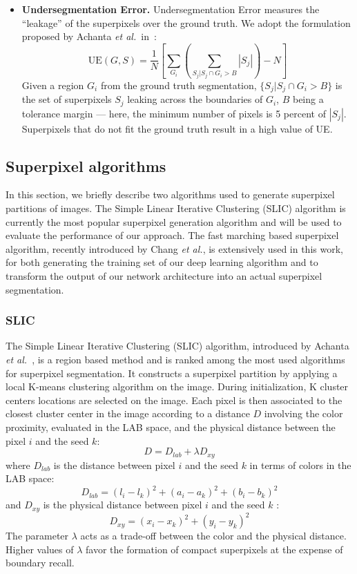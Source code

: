 \documentclass{article}
\begin{document}
\begin{itemize}
            \item \textbf{Undersegmentation Error.} Undersegmentation Error measures the ``leakage'' of the superpixels over the ground truth. We adopt the formulation proposed by Achanta \textit{et al.}~in~\cite{achanta2012}:
            $$
            \mathrm{UE}(G,S)=\frac{1}{N} \left[\sum_{G_i} \left(\sum_{S_j | S_j \cap G_i>B}|S_j|\right)-N\right]
            $$
            Given a region $G_i$ from the ground truth segmentation, $\{S_j | S_j \cap G_i>B\}$ is the set of superpixels $S_j$ leaking across the boundaries of $G_i$, $B$ being a tolerance margin --- here, the minimum number of pixels is 5 percent of $|S_j|$. Superpixels that do not fit the ground truth result in a high value of UE.
        \end{itemize}

    \subsection{Superpixel algorithms}
        In this section, we briefly describe two algorithms used to generate superpixel partitions of images.  The Simple Linear Iterative Clustering (SLIC) algorithm is currently the most popular superpixel generation algorithm and will be used to evaluate the performance of our approach. The fast marching based superpixel algorithm, recently introduced by Chang \textit{et al.}\cite{figliuzzi2019}, is extensively used in this work, for both generating the training set of our deep learning algorithm and to transform the output of our network architecture into an actual superpixel segmentation.

        \subsubsection{SLIC}
            The Simple Linear Iterative Clustering (SLIC) algorithm, introduced by Achanta \textit{et al.}~\cite{achanta2012,achanta2017}, is a region based method and is ranked among the most used algorithms for superpixel segmentation. It constructs a superpixel partition by applying a local K-means clustering algorithm on the image. During initialization, K cluster centers locations are selected on the image. Each pixel is then associated to the closest cluster center in the image according to a distance $D$ involving the color proximity, evaluated in the LAB space, and the physical distance between the pixel $i$ and the seed $k$:
            $$
            D = D_{lab} + \lambda D_{xy}
            $$
            where $D_{lab}$ is the distance between pixel $i$ and the seed $k$ in terms of colors in the LAB space:
            $$
            D_{lab} = (l_i - l_k)^2 + (a_i - a_k)^2 + (b_i - b_k)^2
            $$
            and $D_{xy}$ is the physical distance between pixel $i$ and the seed $k$ :
            $$
            D_{xy} = (x_i - x_k)^2 + (y_i - y_k)^2
            $$
            The parameter $\lambda $ acts as a trade-off between the color and the physical distance. Higher values of $\lambda $ favor the formation of compact superpixels at the expense of boundary recall.
\end{document}
